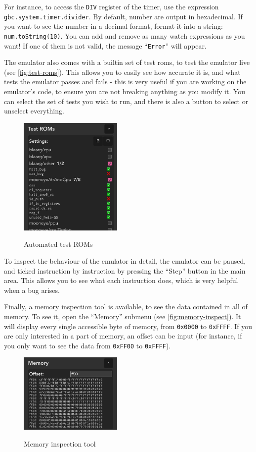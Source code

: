 For instance, to access the \texttt{DIV} register of the timer, use the expression \texttt{gbc.system.timer.divider}. By default, number are output in hexadecimal. If you want to see the number in a decimal format, format it into a string: \texttt{num.toString(10)}. You can add and remove as many watch expressions as you want! If one of them is not valid, the message ``\texttt{Error}'' will appear.

The emulator  also comes with a builtin set of test \glspl{rom}, to test the emulator live (see \autoref{fig:test-roms}). This allows you to easily see how accurate it is, and what tests the emulator passes and fails - this is very useful if you are working on the emulator's code, to ensure you are not breaking anything as you modify it. You can select the set of tests you wish to run, and there is also a button to select or unselect everything.

\begin{figure}[h]
    \centering
    \includegraphics[width=5cm]{images/test-roms}\\
    \caption{Automated test ROMs}
    \label{fig:test-roms}
\end{figure}

To inspect the behaviour of the emulator in detail, the emulator can be paused, and ticked instruction by instruction by pressing the ``Step'' button in the main area. This allows you to see what each instruction does, which is very helpful when a bug arises.

Finally, a memory inspection tool is available, to see the data contained in all of memory. To see it, open the ``Memory'' submenu (see \autoref{fig:memory-inspect}). It will display every single accessible byte of memory, from \texttt{0x0000} to \texttt{0xFFFF}. If you are only interested in a part of memory, an offset can be input (for instance, if you only want to see the data from \texttt{0xFF00} to \texttt{0xFFFF}).

\begin{figure}[h]
    \centering
    \includegraphics[width=5cm]{images/memory-inspect}\\
    \caption{Memory inspection tool}
    \label{fig:memory-inspect}
\end{figure}